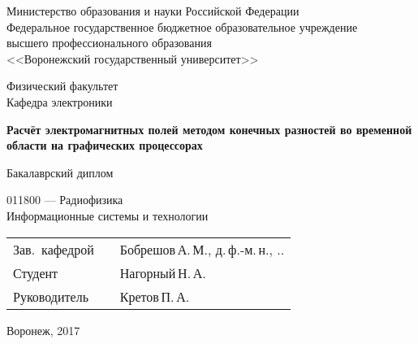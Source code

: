 \begin{titlepage}

\centering
Министерство образования и науки Российской Федерации\\
Федеральное государственное бюджетное образовательное учреждение\\
высшего профессионального образования\\
<<Воронежский государственный университет>>\\

\vspace{20mm}

Физический факультет\\
Кафедра электроники

\vspace{35mm}

\textbf{
    Расчёт электромагнитных полей методом конечных разностей во временной области на графических процессорах}

\vspace{15mm}

Бакалаврский диплом\\

\vspace{10mm}

011800 --- Радиофизика\\
Информационные системы и технологии\\

\vspace{20mm}

\begin{tabularx}{\textwidth}{lll}
Зав.~кафедрой & \hspace{35mm} & Бобрешов\,А.\,М., д.\,ф.-м.\,н.,
\underline{\hspace{5mm}}.\underline{\hspace{5mm}}.\underline{\hspace{10mm}}\\
Студент       & \hspace{35mm} & Нагорный\,Н.\,А.\\
Руководитель  & \hspace{35mm} &  Кретов\,П.\,А.\\
\end{tabularx}

\vspace*{\fill}

Воронеж, 2017

\end{titlepage}

\setcounter{page}{2}